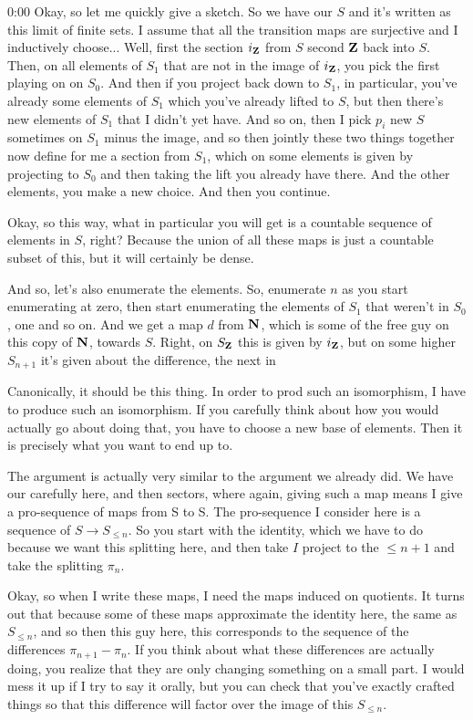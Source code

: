 \begin{unfinished}{0:00}
Okay, so let me quickly give a sketch. So we have our $S$ and it's written as this limit of finite sets. I assume that all the transition maps are surjective and I inductively choose... Well, first the section $i_\mathbf Z$ from $S$ second $\mathbf Z$ back into $S$. Then, on all elements of $S_1$ that are not in the image of $i_\mathbf Z$, you pick the first playing on on $S_0$. And then if you project back down to $S_1$, in particular, you've already some elements of $S_1$ which you've already lifted to $S$, but then there's new elements of $S_1$ that I didn't yet have. And so on, then I pick $p_i$ new $S$ sometimes on $S_1$ minus the image, and so then jointly these two things together now define for me a section from $S_1$, which on some elements is given by projecting to $S_0$ and then taking the lift you already have there. And the other elements, you make a new choice. And then you continue.

Okay, so this way, what in particular you will get is a countable sequence of elements in $S$, right? Because the union of all these maps is just a countable subset of this, but it will certainly be dense.

And so, let's also enumerate the elements. So, enumerate $n$ as you start enumerating at zero, then start enumerating the elements of $S_1$ that weren't in $S_0$, one and so on. And we get a map $d$ from $\mathbf N$, which is some of the free guy on this copy of $\mathbf N$, towards $S$. Right, on $S_\mathbf Z$ this is given by $i_\mathbf Z$, but on some higher $S_{n+1}$ it's given about the difference, the next in

Canonically, it should be this thing. In order to prod such an isomorphism, I have to produce such an isomorphism. If you carefully think about how you would actually go about doing that, you have to choose a new base of elements. Then it is precisely what you want to end up to.

The argument is actually very similar to the argument we already did. We have our carefully here, and then sectors, where again, giving such a map means I give a pro-sequence of maps from S to S. The pro-sequence I consider here is a sequence of $S \to S_{\leq n}$. So you start with the identity, which we have to do because we want this splitting here, and then take $I$ project to the $\leq n+1$ and take the splitting $\pi_n$.

Okay, so when I write these maps, I need the maps induced on quotients. It turns out that because some of these maps approximate the identity here, the same as $S_{\leq n}$, and so then this guy here, this corresponds to the sequence of the differences $\pi_{n+1} - \pi_n$. If you think about what these differences are actually doing, you realize that they are only changing something on a small part. I would mess it up if I try to say it orally, but you can check that you've exactly crafted things so that this difference will factor over the image of this $S_{\leq n}$.


\end{unfinished}
